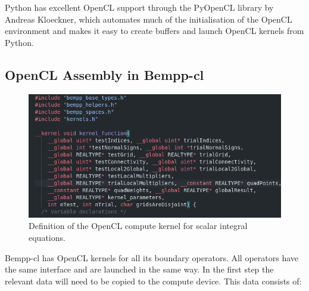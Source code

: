 Python has excellent OpenCL support through the PyOpenCL library by Andreas Kloeckner, which automates much of the initialisation of the OpenCL environment and makes it easy to create buffers and launch OpenCL kernels from Python.

\subsection{OpenCL Assembly in Bempp-cl}

\begin{figure}
	\center
	\includegraphics[width=12cm]{img/kernel_header}
	\caption{Definition of the OpenCL compute kernel for scalar integral equations.}
	\label{fig:kernel_definition}
\end{figure}


Bempp-cl has OpenCL kernels for all its boundary operators. All operators have the same interface and are launched in the same way. In the first step the relevant data will need to be copied to the compute device. This data consists of:

